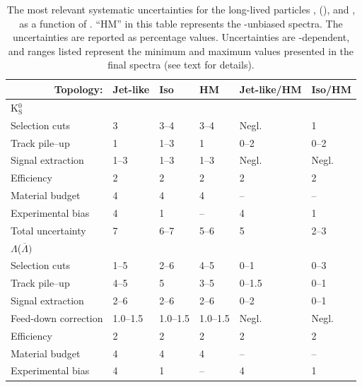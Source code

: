 \begin{table}[h!]
\centering
\caption{The most relevant systematic uncertainties for the long-lived particles \kzero, \LA(\AL), and \XI, as a function of \SOPT. ``HM'' in this table represents the \SOPT-unbiased spectra. The uncertainties are reported as percentage values. Uncertainties are \pt-dependent, and ranges listed represent the minimum and maximum values presented in the final spectra (see text for details). }\label{Tab:SysLong}

\begin{tabular}{|l|lllll|}
\hline
\multicolumn{1}{|r|}{Topology:}              & Jet-like     & Iso       & HM        & Jet-like/HM       & Iso/HM      \\ \hline

\multicolumn{6}{l}{\parbox[b][1.2em]{1em}{K$^0_\mathrm{S}$}} \\
\hline
Selection cuts        & 3    & 3--4     & 3--4     & Negl.          & 1          \\
Track pile--up        & 1 & 1--3 & 1 & 0--2 & 0--2   \\
Signal extraction     & 1--3     & 1--3     & 1--3     & Negl. & Negl. \\
Efficiency            & 2    & 2    & 2    & 2         & 2         \\
Material budget       & 4    & 4    & 4    & --              & --              \\
Experimental bias     & 4    & 1    & --         & 4         & 1         \\ \hline
Total uncertainty     & 7    & 6--7   & 5--6     & 5         & 2--3          \\ \hline
\multicolumn{6}{l}{\parbox[b][1.2em]{1em}{$\Lambda$($\overline{\Lambda})$}} \\
\hline
Selection cuts & 1--5     & 2--6     & 4--5     & 0--1          & 0--3          \\
Track pile--up        & 4--5 & 5 & 3--5 & 0--1.5 & 0--1   \\
Signal extraction     & 2--6     & 2--6     & 2--6     & 0--2          & 0--1          \\
Feed-down correction   & 1.0--1.5 & 1.0--1.5 & 1.0--1.5 & Negl. & Negl. \\
Efficiency            & 2    & 2    & 2    & 2         & 2         \\
Material budget       & 4    & 4    & 4    & --              & --              \\
Experimental bias     & 4    & 1    & --         & 4         & 1         \\ \hline

\end{tabular}
\end{table}
